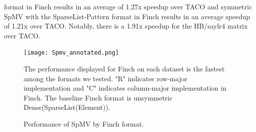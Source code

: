  format in Finch results in an average of 1.27x speedup over TACO and symmetric SpMV with the SparseList-Pattern format in Finch results in an average speedup of 1.21x over TACO. Notably, there is a 1.91x speedup for the HB/saylr4 matrix over TACO. 






\begin{figure}
    \texttt{[image: Spmv\_annotated.png]}
    \vspace{-18pt}
    \caption{Performance of SpMV by Finch format.}
    \label{fig:spmv_grouped}
    \footnotesize The performance displayed for Finch on each dataset is the fastest among the formats we tested. "R" indicates row-major implementation and "C" indicates column-major implementation in Finch. The baseline Finch format is unsymmetric Dense(SparseList(Element)).
\end{figure}

